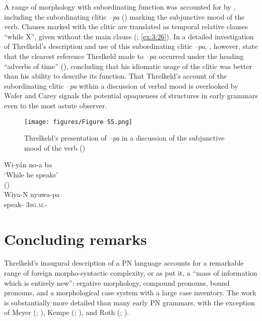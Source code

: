 A range of morphology with subordinating function was accounted for by \citet[70]{threlkeld_australian_1834}, including the subordinating clitic \textit{–pa} (\citealt[93]{lissarrague_salvage_2006}) marking the subjunctive mood of the verb. Clauses marked with the clitic are translated as temporal relative clauses “while X”, given without the main clause (; \ref{ex:3:26}). In a detailed investigation of Threlkeld’s description and use of this subordinating clitic \textit{–pa}, \citet[126--132]{wafer_waiting_2011}, however, state that the clearest reference Threlkeld made to \textit{–pa} occurred under the heading “adverbs of time” (\citeyear[75--76]{threlkeld_australian_1834}), concluding that his idiomatic usage of the clitic was better than his ability to describe its function. That Threlkeld’s account of the subordinating clitic \textit{–pa} within a discussion of verbal mood is overlooked by Wafer and Carey signals the potential opaqueness of structures in early grammars even to the most astute observer.

\begin{figure}[t]
\texttt{[image: figures/Figure 55.png]}
\caption{Threlkeld’s presentation of \textit{–pa} in a discussion of the subjunctive mood of the verb (\citeyear[70]{threlkeld_australian_1834})}
\label{fig:3:55} 
\end{figure}


\ea\label{ex:3:26}
Wi-yán    no-a   ba \\
\glt `While he speaks' \\
(\citealt[70]{threlkeld_australian_1834})\\
\gll Wiya-N		nyuwa-pa \\
speak-	3\textsc{sg}.\textsc{m}.- \\
\z

\section{Concluding remarks}
\label{sec:key:3.4}

Threlkeld’s inaugural description of a PN language accounts for a remarkable range of foreign morpho-syntactic complexity, or as \citet[482]{hale_languages_1846} put it, a “mass of information which is entirely new”: ergative morphology, compound pronouns, bound pronouns, and a morphological case system with a large case inventory. The work is substantially more detailed than many early PN grammars, with the exception of Meyer (\citeyear{meyer_vocabulary_1843}; ), Kempe (\citeyear{kempe_grammar_1891}; ), and Roth (\citeyear{roth_ethnological_1897}; ).

